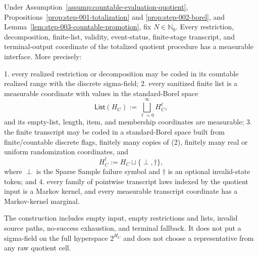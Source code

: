 \begin{proposition}\label{prop:step-003-coding}
Under Assumption~\ref{assump:countable-evaluation-quotient}, 
Propositions~\ref{prop:step-001-totalization} and
\ref{prop:step-002-borel}, and
Lemma~\ref{lem:step-003-countable-promotion}, fix
\(N\in\mathbb N_0\). Every restriction, decomposition, finite-list,
validity, event-status, finite-stage transcript, and terminal-output
coordinate of the totalized quotient procedure has a measurable interface.
More precisely:

1. every realized restriction or decomposition may be coded in its
   countable realized range with the discrete sigma-field;
2. every sanitized finite list is a measurable coordinate with values in
   the standard-Borel space
   \[
   \mathsf{List}(H_C):=\bigsqcup_{\ell=0}^{\infty}H_C^\ell,
   \tag{2}
   \]
   and its empty-list, length, item, and membership coordinates are
   measurable;
3. the finite transcript may be coded in a standard-Borel space built from
   finite/countable discrete flags, finitely many copies of (2), finitely
   many real or uniform randomization coordinates, and
   \[
   H_C^\dagger:=H_C\sqcup\{\perp,\dagger\},
   \tag{3}
   \]
   where \(\perp\) is the Sparse Sample failure symbol and \(\dagger\) is an
   optional invalid-state token; and
4. every family of pointwise transcript laws indexed by the quotient input
   is a Markov kernel, and every measurable transcript coordinate has a
   Markov-kernel marginal.

The construction includes empty input, empty restrictions and lists,
invalid source paths, no-success exhaustion, and terminal fallback. It does
not put a sigma-field on the full hyperspace \(2^{H_C}\) and does not choose
a representative from any raw quotient cell.


\end{proposition}

